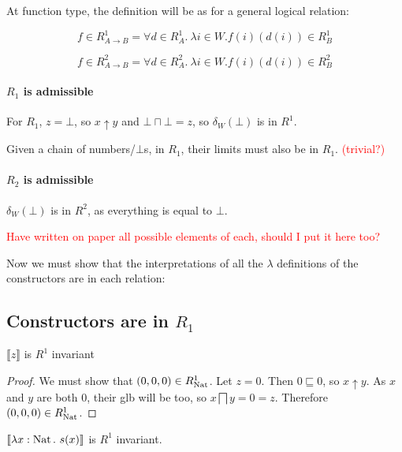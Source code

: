 At function type, the definition will be as for a general logical relation:

\[ f \in R_{A \to B}^1 = \forall d \in R_A^1. \ \lambda i \in W. f(i)(d(i)) \in R_B^1 \]

\[ f \in R_{A \to B}^2 = \forall d \in R_A^2. \ \lambda i \in W. f(i)(d(i)) \in R_B^2 \]

\paragraph{$R_1$ is admissible} For $R_1$, $z = \bot$, so $x \uparrow y$ and $\bot \sqcap \bot = z$, so $\delta_W(\bot)$ is in $R^1$.

Given a chain of numbers/$\bot$s, in $R_1$, their limits must also be in $R_1$. \textcolor{red}{(trivial?)}

\paragraph{$R_2$ is admissible}

$\delta_W(\bot)$ is in $R^2$, as everything is equal to $\bot$.

\textcolor{red}{Have written on paper all possible elements of each, should I put it here too?}

Now we must show that the interpretations of all the $\lambda$ definitions of the constructors are in each relation:

\subsection{Constructors are in $R_1$}

\begin{lem}
$\llbracket z \rrbracket$ is $R^1$ invariant
\end{lem}

\vspace{0.25cm}

\begin{proof} We must show that $(0,0,0) \in R_{\operatorname{Nat}}^1$. Let $z = 0$. Then $0 \sqsubseteq 0$, so $x \uparrow y$. As $x$ and $y$ are both $0$, their glb will be too, so $x \bigsqcap y = 0 = z$. Therefore $(0,0,0) \in R_{\operatorname{Nat}}^1$.
\end{proof}

\vspace{0.5cm}

\begin{lem}
$\llbracket \lambda x : \operatorname{Nat} . \ s(x) \rrbracket$ is $R^1$ invariant.
\end{lem}

